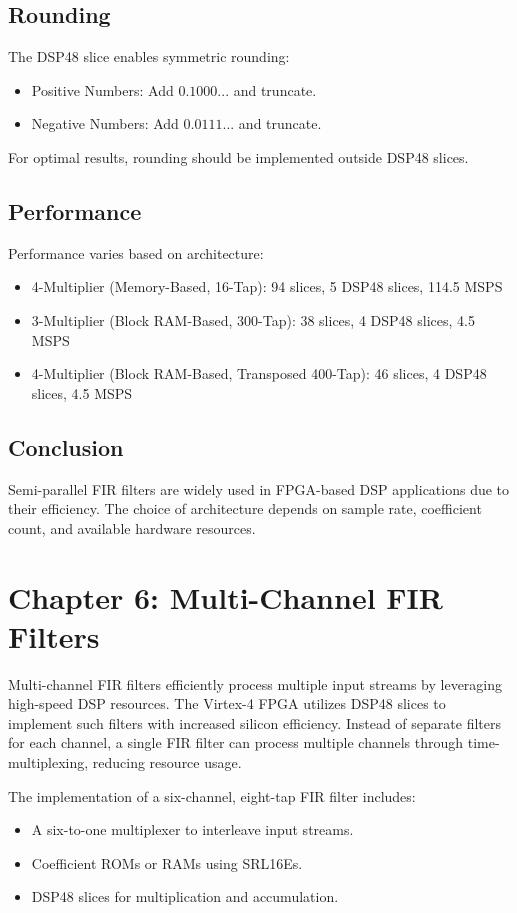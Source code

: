 \documentclass{article}
\begin{document}
	\subsection{Rounding}
	The DSP48 slice enables symmetric rounding:
	\begin{itemize}
		\item Positive Numbers: Add $0.1000...$ and truncate.
		\item Negative Numbers: Add $0.0111...$ and truncate.
	\end{itemize}
	For optimal results, rounding should be implemented outside DSP48 slices.
	
	\subsection{Performance}
	Performance varies based on architecture:
	\begin{itemize}
		\item 4-Multiplier (Memory-Based, 16-Tap): 94 slices, 5 DSP48 slices, 114.5 MSPS
		\item 3-Multiplier (Block RAM-Based, 300-Tap): 38 slices, 4 DSP48 slices, 4.5 MSPS
		\item 4-Multiplier (Block RAM-Based, Transposed 400-Tap): 46 slices, 4 DSP48 slices, 4.5 MSPS
	\end{itemize}
	
	\subsection{Conclusion}
	Semi-parallel FIR filters are widely used in FPGA-based DSP applications due to their efficiency. The choice of architecture depends on sample rate, coefficient count, and available hardware resources.
	
	\newpage
	
	\section{Chapter 6: Multi-Channel FIR Filters}
	Multi-channel FIR filters efficiently process multiple input streams by leveraging high-speed DSP resources. The Virtex-4 FPGA utilizes DSP48 slices to implement such filters with increased silicon efficiency. Instead of separate filters for each channel, a single FIR filter can process multiple channels through time-multiplexing, reducing resource usage.
	
	The implementation of a six-channel, eight-tap FIR filter includes:
	\begin{itemize}
		\item A six-to-one multiplexer to interleave input streams.
		\item Coefficient ROMs or RAMs using SRL16Es.
		\item DSP48 slices for multiplication and accumulation.
	\end{itemize}
	
\end{document}
